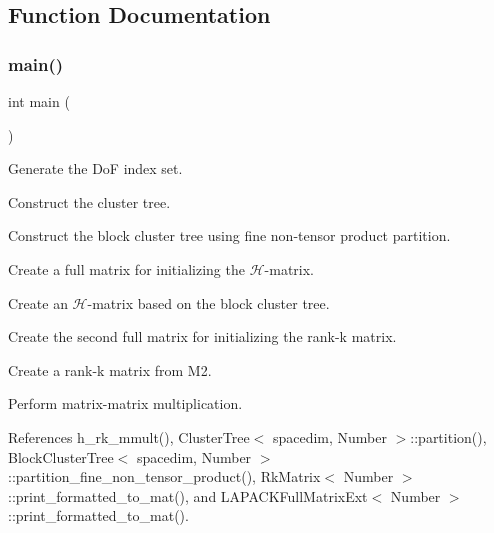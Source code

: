 \subsection{Function Documentation}
\mbox{\label{hmatrix-rkmatrix-mmult_8cc_ae66f6b31b5ad750f1fe042a706a4e3d4}} 
\subsubsection{\texorpdfstring{main()}{main()}}
{\footnotesize\ttfamily int main (\begin{DoxyParamCaption}{ }\end{DoxyParamCaption})}

Generate the DoF index set.

Construct the cluster tree.

Construct the block cluster tree using fine non-\/tensor product partition.

Create a full matrix for initializing the $\mathcal{H}$-\/matrix.

Create an $\mathcal{H}$-\/matrix based on the block cluster tree.

Create the second full matrix for initializing the rank-\/k matrix.

Create a rank-\/k matrix from {\ttfamily M2}.

Perform matrix-\/matrix multiplication.

References h\+\_\+rk\+\_\+mmult(), Cluster\+Tree$<$ spacedim, Number $>$\+::partition(), Block\+Cluster\+Tree$<$ spacedim, Number $>$\+::partition\+\_\+fine\+\_\+non\+\_\+tensor\+\_\+product(), Rk\+Matrix$<$ Number $>$\+::print\+\_\+formatted\+\_\+to\+\_\+mat(), and L\+A\+P\+A\+C\+K\+Full\+Matrix\+Ext$<$ Number $>$\+::print\+\_\+formatted\+\_\+to\+\_\+mat().

